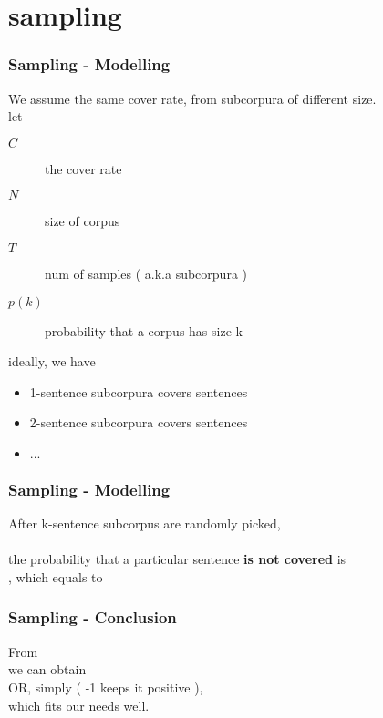 \section{sampling}{

  \begin{frame}
    \frametitle{Sampling - Modelling}
    We assume the same cover rate, from subcorpura of different size. \\
    let
    \begin{description}
      \item[$C$]     the cover rate
      \item[$N$]     size of corpus
      \item[$T$]     num of samples ( a.k.a subcorpura )
      \item[$p(k)$]  probability that a corpus has size k
    \end{description}
    ideally, we have
    \begin{itemize}
      \item {} 1-sentence subcorpura covers  sentences
      \item {} 2-sentence subcorpura covers  sentences
      \item $ ... $
    \end{itemize}
  \end{frame}

  \begin{frame} \frametitle{Sampling - Modelling}
    After  k-sentence subcorpus are randomly picked,
    \\ \  \\
    the probability that a particular sentence {\bf is not covered} is
    \\
    , which equals to 
  \end{frame}

  \begin{frame} \frametitle{Sampling - Conclusion}
    From 
    \\
    we can obtain 
    \\
    OR, simply   ( -1 keeps it positive ),
    \\
    \vspace{2em}
    which fits our needs well.
  \end{frame}

}

